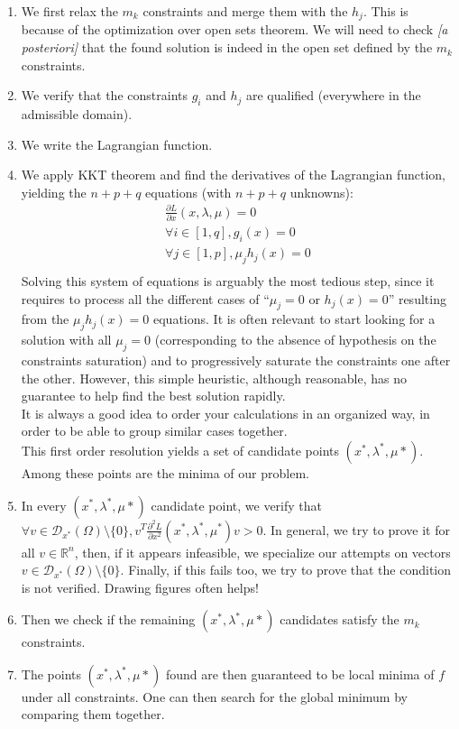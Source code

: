 \documentclass{article}
\begin{document}
\begin{enumerate}
\item We first relax the $m_k$ constraints and merge them with the $h_j$. This is because of the optimization over open sets theorem. We will need to check \emph{[a posteriori]} that the found solution is indeed in the open set defined by the $m_k$ constraints.
\item We verify that the constraints $g_i$ and $h_j$ are qualified (everywhere in the admissible domain).
\item We write the Lagrangian function.
\item We apply KKT theorem and find the derivatives of the Lagrangian function, yielding the $n+p+q$ equations (with $n+p+q$ unknowns):
\begin{equation*}
\begin{array}{c}
\frac{\partial L}{\partial x}(x,\lambda,\mu)=0 \\
\forall i\in[1,q], g_i(x) = 0\\
\forall j\in[1,p], \mu_j h_j(x) = 0\\
\end{array}
\end{equation*}
Solving this system of equations is arguably the most tedious step, since it requires to process all the different cases of ``$\mu_j=0$ or $h_j(x)=0$'' resulting from the $\mu_j h_j(x)=0$ equations. It is often relevant to start looking for a solution with all $\mu_j=0$ (corresponding to the absence of hypothesis on the constraints saturation) and to progressively saturate the constraints one after the other. However, this simple heuristic, although reasonable, has no guarantee to help find the best solution rapidly.\\
It is always a good idea to order your calculations in an organized way, in order to be able to group similar cases together.\\
This first order resolution yields a set of candidate points $(x^*,\lambda^*,\mu*)$. Among these points are the minima of our problem.
\item In every $(x^*,\lambda^*,\mu*)$ candidate point, we verify that $\forall v\in \mathcal{D}_{x^*}(\Omega)\setminus\{0\}, v^T \frac{\partial^2
L}{\partial x^2}(x^*,\lambda^*,\mu^*) v > 0$. In general, we try to prove it for all $v\in\mathbb{R}^n$, then, if it appears infeasible, we specialize our attempts on vectors $v\in \mathcal{D}_{x^*}(\Omega)\setminus\{0\}$. Finally, if this fails too, we try to prove that the condition is not verified. Drawing figures often helps!
\item Then we check if the remaining $(x^*,\lambda^*,\mu*)$ candidates satisfy the $m_k$ constraints.
\item The points $(x^*,\lambda^*,\mu*)$ found are then guaranteed to be local minima of $f$ under all constraints. One can then search for the global minimum by comparing them together.
\end{enumerate}
\end{document}
